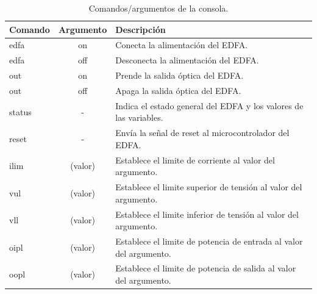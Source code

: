 \begin{table}[H]
	\centering
	\caption{Comandos/argumentos de la consola.}
	\begin{tabular}{l c p{8cm}}
		\toprule
		\textbf{Comando} & \textbf{Argumento} & \textbf{Descripción} \\
		\midrule
		edfa	& on & Conecta la alimentación del EDFA.	\\
		edfa	& off & Desconecta la alimentación del EDFA. \\
		out	& on & Prende la salida óptica del EDFA. \\
		out   & off & Apaga la salida óptica del EDFA. \\
		status & - & Indica el estado general del EDFA y los valores de las variables. \\
		reset & - & Envía la señal de reset al microcontrolador del EDFA. \\
		ilim	& (valor) & Establece el limite de corriente al valor del argumento. \\
		vul	& (valor) & Establece el limite superior de tensión al valor del argumento. \\
		vll		& (valor) & Establece el limite inferior de tensión al valor del argumento. \\
		oipl	& (valor) & Establece el limite de potencia de entrada al valor del argumento. \\
		oopl & (valor) & Establece el limite de potencia de salida al valor del argumento. \\
		\bottomrule
		\hline
	\end{tabular}
	\label{tab:tablacmd}
\end{table}